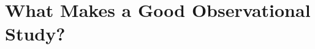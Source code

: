 \documentclass[xcolor=dvipsnames]{beamer}
\begin{document}
\section*{What Makes a Good Observational
Study?}\label{what-makes-a-good-observational-study}
%
%

%
\end{document}

